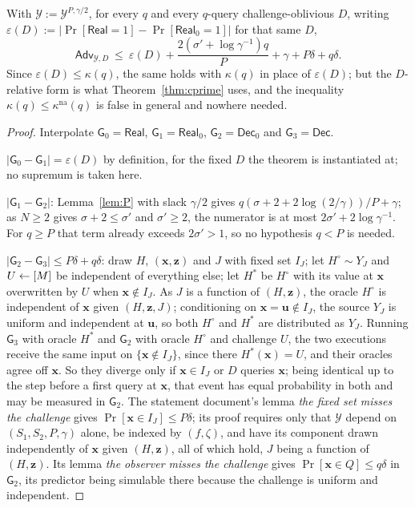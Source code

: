 \documentclass{aicr-solution}
\newcommand{\Adv}{\mathsf{Adv}}
\newcommand{\Real}{\mathsf{Real}}
\newcommand{\Dec}{\mathsf{Dec}}
\newcommand{\Prob}[1]{\Pr\!\left[#1\right]}
\newcommand{\vx}{\mathbf{x}}
\newcommand{\vz}{\mathbf{z}}
\newcommand{\vu}{\mathbf{u}}
\newcommand{\kna}{\kappa^{\mathrm{na}}}
\begin{document}
\begin{theorem}\label{thm:C}
With $\mathcal Y:=\mathcal Y^{P,\gamma/2}$, for every $q$ and every $q$-query
challenge-oblivious $D$, writing
$\varepsilon(D):=\bigl|\Prob{\Real=1}-\Prob{\Real_0=1}\bigr|$ for that same $D$,
\[
  \Adv_{\mathcal Y,D}\ \le\ \varepsilon(D)
  +\frac{2(\sigma'+\log\gamma^{-1})q}{P}+\gamma+P\delta+q\delta .
\]
Since $\varepsilon(D)\le\kappa(q)$, the same holds with $\kappa(q)$ in place of
$\varepsilon(D)$; but the $D$-relative form is what Theorem~\ref{thm:cprime}
uses, and the inequality $\kappa(q)\le\kna(q)$ is false in general and nowhere
needed.
\end{theorem}

\begin{proof}
Interpolate $\mathsf G_0=\Real$, $\mathsf G_1=\Real_0$, $\mathsf G_2=\Dec_0$ and
$\mathsf G_3=\Dec$.

$|\mathsf G_0-\mathsf G_1|=\varepsilon(D)$ by definition, for the fixed $D$ the
theorem is instantiated at; no supremum is taken here.

$|\mathsf G_1-\mathsf G_2|$: Lemma~\ref{lem:P} with slack $\gamma/2$ gives
$q(\sigma+2+2\log(2/\gamma))/P+\gamma$; as $N\ge2$ gives $\sigma+2\le\sigma'$ and
$\sigma'\ge2$, the numerator is at most $2\sigma'+2\log\gamma^{-1}$. For $q\ge P$
that term already exceeds $2\sigma'>1$, so no hypothesis $q<P$ is needed.

$|\mathsf G_2-\mathsf G_3|\le P\delta+q\delta$: draw $H$, $(\vx,\vz)$ and $J$
with fixed set $I_J$; let $H^{\circ}\sim Y_J$ and $U\leftarrow[M]$ be independent of
everything else; let $H^{*}$ be $H^{\circ}$ with its value at $\vx$ overwritten by
$U$ when $\vx\notin I_J$. As $J$ is a function of $(H,\vz)$, the oracle $H^{\circ}$ is
independent of $\vx$ given $(H,\vz,J)$; conditioning on $\vx=\vu\notin I_J$, the
source $Y_J$ is uniform and independent at $\vu$, so both $H^{\circ}$ and
$H^{*}$ are distributed as $Y_J$. Running $\mathsf G_3$ with oracle $H^{*}$ and
$\mathsf G_2$ with oracle $H^{\circ}$ and challenge $U$, the two executions
receive the same input on $\{\vx\notin I_J\}$, since there $H^{*}(\vx)=U$, and
their oracles agree off $\vx$. So they diverge only if $\vx\in I_J$ or $D$ queries
$\vx$; being identical up to the step before a first query at $\vx$, that event
has equal probability in both and may be measured in $\mathsf G_2$. The statement
document's lemma \emph{the fixed set misses the challenge} gives
$\Prob{\vx\in I_J}\le P\delta$; its proof requires only that $\mathcal Y$
depend on $(S_1,S_2,P,\gamma)$ alone, be indexed by $(f,\zeta)$, and have its
component drawn independently of $\vx$ given $(H,\vz)$, all of which hold, $J$
being a function of $(H,\vz)$. Its lemma \emph{the observer misses the challenge}
gives $\Prob{\vx\in Q}\le q\delta$ in $\mathsf G_2$, its predictor being
simulable there because the challenge is uniform and independent.
\end{proof}
\end{document}

